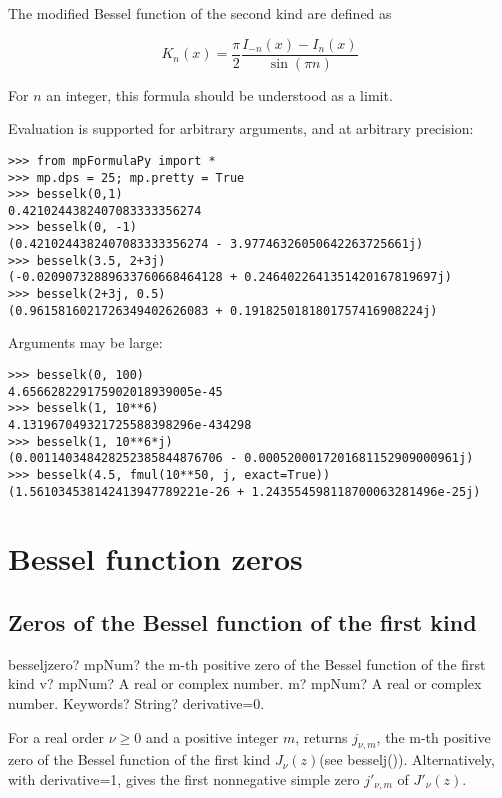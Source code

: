 The modified Bessel function of the second kind are defined as

\begin{equation}
K_n(x)= \frac{\pi}{2} \frac{I_{-n}(x) - I_n(x)}{\sin(\pi n)}
\end{equation}

For $n$ an integer, this formula should be understood as a limit.

Evaluation is supported for arbitrary arguments, and at arbitrary precision:

\begin{lstlisting}
>>> from mpFormulaPy import *
>>> mp.dps = 25; mp.pretty = True
>>> besselk(0,1)
0.4210244382407083333356274
>>> besselk(0, -1)
(0.4210244382407083333356274 - 3.97746326050642263725661j)
>>> besselk(3.5, 2+3j)
(-0.02090732889633760668464128 + 0.2464022641351420167819697j)
>>> besselk(2+3j, 0.5)
(0.9615816021726349402626083 + 0.1918250181801757416908224j)
\end{lstlisting}

Arguments may be large:

\begin{lstlisting}
>>> besselk(0, 100)
4.656628229175902018939005e-45
>>> besselk(1, 10**6)
4.131967049321725588398296e-434298
>>> besselk(1, 10**6*j)
(0.001140348428252385844876706 - 0.0005200017201681152909000961j)
>>> besselk(4.5, fmul(10**50, j, exact=True))
(1.561034538142413947789221e-26 + 1.243554598118700063281496e-25j)
\end{lstlisting}




\newpage
\section{Bessel function zeros}


\subsection{Zeros of the Bessel function of the first kind}

\begin{mpFunctionsExtract}
	\mpFunctionThree
	{besseljzero? mpNum? the m-th positive zero of the Bessel function of the first kind}
	{v? mpNum? A real or complex number.}
	{m? mpNum? A real or complex number.}	
	{Keywords? String? derivative=0.}	
\end{mpFunctionsExtract}

\vpara
For a real order $\nu \geq 0$ and a positive integer $m$, returns $j_{\nu, m}$, the m-th positive zero of the Bessel function of the first kind $J_{\nu}(z)$(see besselj()). Alternatively, with derivative=1, gives the first nonnegative simple zero $j'_{\nu, m}$ of $J'_{\nu}(z)$.


